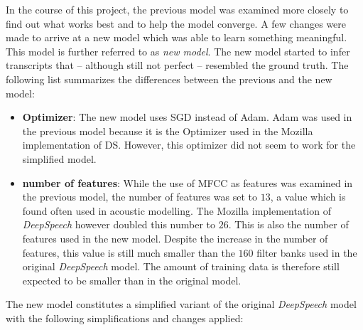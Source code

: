 In the course of this project, the previous model was examined more closely to find out what works best and to help the model converge. A few changes were made to arrive at a new model which was able to learn something meaningful. This model is further referred to as \textit{new model}. The new model started to infer transcripts that -- although still not perfect -- resembled the ground truth. The following list summarizes the differences between the previous and the new model:

\begin{itemize}
	\item \textbf{Optimizer}: The new model uses \ac{SGD} instead of Adam. Adam was used in the previous model because it is the Optimizer used in the Mozilla implementation of \ac{DS}. However, this optimizer did not seem to work for the simplified model.
	\item \textbf{number of features}: While the use of \ac{MFCC} as features was examined in the previous model, the number of features was set to $13$, a value which is found often used in acoustic modelling. The Mozilla implementation of \textit{DeepSpeech} however doubled this number to $26$. This is also the number of features used in the new model. Despite the increase in the number of features, this value is still much smaller than the $160$ filter banks used in the original \textit{DeepSpeech} model. The amount of training data is therefore still expected to be smaller than in the original model.
\end{itemize}

The new model constitutes a simplified variant of the original \textit{DeepSpeech} model with the following simplifications and changes applied:

